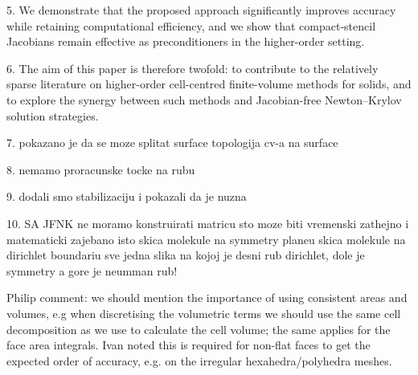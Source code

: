 \documentclass[sn-mathphys,Numbered]{sn-jnl}%
\begin{document}
	5.	We demonstrate that the proposed approach significantly improves accuracy while retaining computational efficiency, and we show that compact-stencil Jacobians remain effective as preconditioners in the higher-order setting.

	6.	The aim of this paper is therefore twofold: to contribute to the relatively sparse literature on higher-order cell-centred finite-volume methods for solids, and to explore the synergy between such methods and Jacobian-free Newton–Krylov solution strategies.
	
	7. pokazano je da se moze splitat surface topologija cv-a na surface
	
	8. nemamo proracunske tocke na rubu
	
	9. dodali smo stabilizaciju i pokazali da je nuzna
	
	10. SA JFNK ne moramo konstruirati matricu sto moze biti vremenski zathejno i matematicki zajebano isto
	skica molekule na symmetry planeu
skica molekule na dirichlet boundariu
sve jedna slika na kojoj je desni rub dirichlet, dole je symmetry a gore je neumman rub!

Philip comment: we should mention the importance of using consistent areas and
volumes, e.g when discretising the volumetric terms we should use the same cell
decomposition as we use to calculate the cell volume; the same applies for the
face area integrals. Ivan noted this is required for non-flat faces to get the
expected order of accuracy, e.g. on the irregular hexahedra/polyhedra meshes.

%
%      
\end{document}
